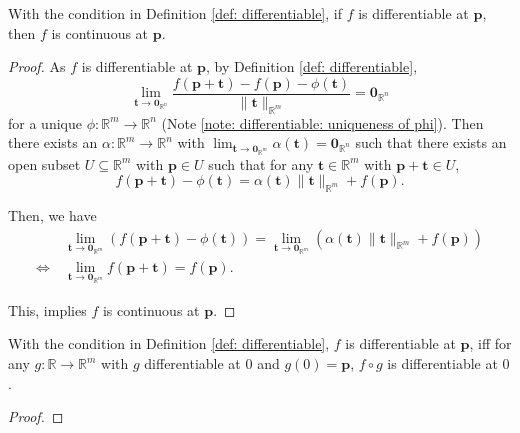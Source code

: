 \begin{lemma}
	With the condition in Definition \ref{def: differentiable}, if $f$ is differentiable at $\mathbf p$, then $f$ is continuous at $\mathbf p$.
	
	\begin{proof}
		As $f$ is differentiable at $\mathbf p$, by Definition \ref{def: differentiable},
		$$
		\lim_{\mathbf t \to \mathbf 0_{\mathbb R^n}} \frac{f(\mathbf p + \mathbf t) - f(\mathbf p) - \phi(\mathbf t)}{\| \mathbf t \|_{\mathbb R^m}} = \mathbf 0_{\mathbb R^n}
		$$
		for a unique $\phi: \mathbb R^m \to \mathbb R^n$ (Note \ref{note: differentiable: uniqueness of phi}). Then there exists an $\alpha: \mathbb R^m \to \mathbb R^n$ with $\displaystyle \lim_{\mathbf t \to \mathbf 0_{\mathbb R^m}}\alpha(\mathbf t) = \mathbf 0_{\mathbb R^n}$ such that there exists an open subset $U \subseteq \mathbb R^m$ with $\mathbf p \in U$ such that for any $\mathbf t \in \mathbb R^m$ with $\mathbf p + \mathbf t \in U$,
		$$
		f(\mathbf p + \mathbf t) - \phi(\mathbf t) = \alpha(\mathbf t)\| \mathbf t \|_{\mathbb R^m} + f(\mathbf p).
		$$
		
		Then, we have
		$$
		\begin{aligned}
			& \ \lim_{\mathbf t \to \mathbf 0_{\mathbb R^m}} (f(\mathbf p + \mathbf t) - \phi(\mathbf t)) = \lim_{\mathbf t \to \mathbf 0_{\mathbb R^m}}( \alpha(\mathbf t)\| \mathbf t \|_{\mathbb R^m} + f(\mathbf p)) \\
			\iff & \ \lim_{\mathbf t \to \mathbf 0_{\mathbb R^m}} f(\mathbf p + \mathbf t) = f(\mathbf p).
		\end{aligned}
		$$
		
		This, implies $f$ is continuous at $\mathbf p$.
	\end{proof}
\end{lemma}


\begin{lemma}
	With the condition in Definition \ref{def: differentiable}, $f$ is differentiable at $\mathbf p$, iff for any $g: \mathbb R \to \mathbb R^m$ with $g$ differentiable at $0$ and $g(0) = \mathbf p$, $f \circ g$ is differentiable at $0$.
	
	\begin{proof}

	\end{proof}
\end{lemma}





